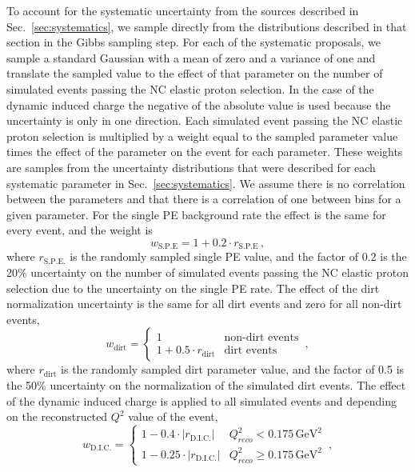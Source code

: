     To account for the systematic uncertainty from the sources described in
    Sec.~\ref{sec:systematics}, we sample directly from the distributions
    described in that section in the Gibbs sampling step.  For each of the
    systematic proposals, we sample a standard Gaussian with a mean of zero and
    a variance of one and translate the sampled value to the effect of that
    parameter on the number of simulated events passing the NC elastic proton
    selection. In the case of the dynamic induced charge the negative of the
    absolute value is used because the uncertainty is only in one direction.
    Each simulated event passing the NC elastic proton selection is multiplied
    by a weight equal to the sampled parameter value times the effect of the
    parameter on the event for each parameter.  These weights are samples from
    the uncertainty distributions that were described for each systematic
    parameter in Sec.~\ref{sec:systematics}. We assume there is no correlation
    between the parameters and that there is a correlation of one between bins
    for a given parameter. For the single PE background rate the effect is the
      same for every event, and the weight is 
    \begin{equation}
      w_{\textrm{S.P.E}} = 1 + 0.2\cdot r_{\textrm{S.P.E}} \,,
    \end{equation}
    where $r_{\textrm{S.P.E.}}$ is the randomly sampled single PE value, and
    the factor of 0.2 is the 20\% uncertainty on the number of simulated events
    passing the NC elastic proton selection due to the uncertainty on the
    single PE rate.  The effect of the dirt normalization uncertainty is the
    same for all dirt events and zero for all non-dirt events,
    \begin{equation}
      w_{\textrm{dirt}} = 
      \begin{cases}
        1 &\textrm{non-dirt events} \\
        1 + 0.5\cdot r_{\textrm{dirt}}  &\textrm{dirt events}
      \end{cases} \,,
    \end{equation}
    where $r_{\textrm{dirt}}$ is the randomly sampled dirt parameter value, and
    the factor of 0.5 is the 50\% uncertainty on the normalization of  the
    simulated dirt events. The effect of the dynamic induced charge is applied
    to all simulated events and depending on the reconstructed $Q^2$ value of
    the event,
    \begin{equation}
      w_{\textrm{D.I.C.}} = 
      \begin{cases}
        1 - 0.4\cdot |r_{\textrm{D.I.C.}}|  &Q^2_{reco} < 0.175 \,\textrm{GeV}^2 \\
        1 - 0.25\cdot |r_{\textrm{D.I.C.}}|  &Q^2_{reco} \ge 0.175 \,\textrm{GeV}^2
      \end{cases} \,,
    \end{equation}
